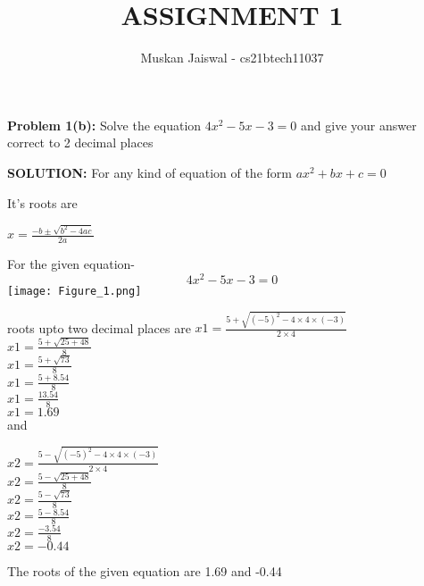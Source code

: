 \documentclass[journal,12pt,two column]{IEEEtran}
\title{ASSIGNMENT 1 }
\author{Muskan Jaiswal - cs21btech11037}
\begin{document}
\maketitle
\textbf{Problem 1(b):} Solve the equation $4x^2-5x-3=0$ and give your answer correct to 2 decimal places
\bigskip

\textbf{SOLUTION:}     For any kind of equation of the form  $ax^2+bx+c=0$

It's roots are

$x=\frac{-b\pm\sqrt{b^2-4ac}}{2a}$

For the given equation-
\begin{equation}
    4x^2-5x-3=0
\end{equation}
\texttt{[image: Figure\_1.png]}

roots upto two decimal places are
$x1=\frac{5+\sqrt{(-5)^2-4\times4\times(-3)}}{2\times4}
$\\


$x1=\frac{5+\sqrt{25+48}}{8}
$
\\
$x1=\frac{5+\sqrt{73}}{8}
$
\\
$x1=\frac{5+8.54}{8}
$ \\

$x1=\frac{13.54}{8}
$
\\
$ x1=1.69
  $\\


and

$x2=\frac{5-\sqrt{(-5)^2-4\times4\times(-3)}}{2\times4}
$\\

$x2=\frac{5-\sqrt{25+48}}{8}
$\\

$x2=\frac{5-\sqrt{73}}{8}
$\\

$x2=\frac{5-8.54}{8} $\\

$x2=\frac{-3.54}{8} $\\

$x2=-0.44
$
\bigskip

The roots of the given equation are 1.69 and -0.44
\end{document}
